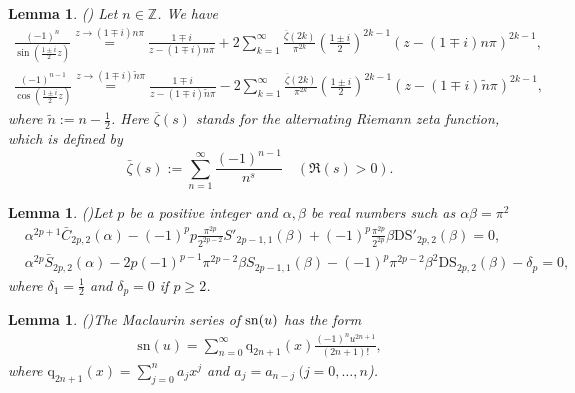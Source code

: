 \documentclass[11pt]{article}
\def\Q{\mathbb{Q}}
\theoremstyle{plain}
\newtheorem{lem}[thm]{Lemma}
\theoremstyle{definition}
\begin{document}
		\begin{lem} \emph{(\cite{XZ2023})} \label{ExpandS-C}
			Let $n\in \mathbb{Z}$. We have
	\begin{align}
			\frac{\left( -1 \right) ^n}{\sin \left( \frac{1\pm i}{2}z \right)}\overset{z\rightarrow \left( 1\mp i \right) n\pi}{=}\frac{1\mp i}{z-\left( 1\mp i \right) n\pi}+2\sum_{k=1}^{\infty}{\frac{\overline{\zeta }\left( 2k \right)}{\pi ^{2k}}\left( \frac{1\pm i}{2} \right) ^{2k-1}\left( z-\left( 1\mp i \right) n\pi \right) ^{2k-1}},
			\\
			\frac{\left( -1 \right) ^{n-1}}{\cos \left( \frac{1\pm i}{2}z \right)}\overset{z\rightarrow \left( 1 \mp i \right) \tilde{n}\pi}{=}\frac{1\mp i}{z-\left( 1\mp i \right) \tilde{n}\pi}-2\sum_{k=1}^{\infty}{\frac{\overline{\zeta }\left( 2k \right)}{\pi ^{2k}}\left( \frac{1\pm i}{2} \right) ^{2k-1}\left( z-\left( 1\mp i \right) \tilde{n}\pi \right) ^{2k-1}},
			\end{align}
			where $\tilde{n}:=n-\frac{1}{2}$. Here  $\overline{\zeta }(s)$ stands for the alternating Riemann zeta function, which is defined by
			$$
	 \bar{\zeta}\left( s \right) :=\sum_{n=1}^{\infty}{\frac{\left( -1 \right) ^{n-1}}{n^s}}\quad \left( \Re \left( s \right) >0 \right).
			$$

				\end{lem}
	\begin{lem}\emph{(\cite[Lem. 1]{XuZhao-2024})}\label{lem-2,C,S}
		Let $p$ be a positive integer and $
		\alpha ,\beta
		$ be real numbers such as $\alpha \beta=\pi^2$
\begin{align}
&\alpha ^{2p+1}\bar{C}_{2p,2}\left( \alpha \right) -\left( -1 \right) ^pp\frac{\pi ^{2p}}{2^{2p-2}}S'_{2p-1,1}\left( \beta \right)
+\left( -1 \right) ^p\frac{\pi ^{2p}}{2^{2p}}\beta
\mathrm{DS}'_{2p,2}\left( \beta \right)
=0,\\
&\alpha ^{2p}\bar{S}_{2p,2}\left( \alpha \right) -2p\left( -1 \right) ^{p-1}\pi ^{2p-2}\beta S_{2p-1,1}\left( \beta \right)
-\left( -1 \right) ^p\pi ^{2p-2}\beta ^2\mathrm{DS}_{2p,2}\left( \beta \right) -\delta _p=0,
	\end{align}
where $\delta_1=\frac{1}{2}$ and $\delta_p=0$ if $p\ge 2$.
	\end{lem}
	\begin{lem}\emph{(\cite[Thm. 2]{A1976})}\label{sn cofficient symmetry}
	The Maclaurin series of ${\rm sn}(u)$ has the form
	\begin{align}\label{sd-exped-one}
		\mathrm{sn}\left( u \right) =\sum_{n=0}^{\infty}{\mathrm{q}_{2n+1}\left( x \right) \frac{\left( -1 \right) ^nu^{2n+1}}{\left( 2n+1 \right) !}},
	\end{align}	
	where $\text{q}_{2n+1}(x)=\sum^{n}_{j=0}a_jx^j$ and $a_j=a_{n-j}\ (j=0,\ldots,n$).
		\end{lem}
\end{document}
